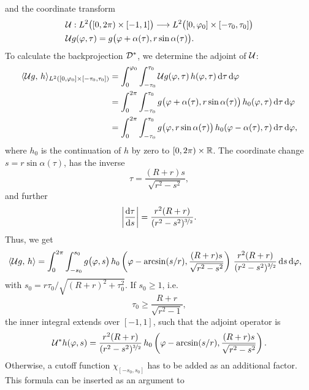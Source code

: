\documentclass{amsart}
\renewcommand*{\phi}{\varphi}
\begin{document}
%
and the coordinate transform 
%
\begin{align}
 &\OPU: L^2\big([0,2\pi) \times [-1,1]\big) \Lto L^2\big([0,\phi_0] \times [-\tau_0,\tau_0]\big) \notag \\
 \label{eq:fanflat:unit_trafo}
 &\OPU g(\phi, \tau) = g\big(\phi + \alpha(\tau), r\sin\alpha(\tau)\big).
\end{align} 
%
To calculate the backprojection ${\mathcal{D}}^*$, we determine the adjoint of ${\mathcal{U}}$:
%
\begin{align*}
 \INNER{\OPU g}{h}_{L^2([0,\phi_0] \times [-\tau_0,\tau_0])}
 &= \int_0^{\phi_0} \int_{-\tau_0}^{\tau_0} \OPU g(\phi, \tau)\, h(\phi, \tau)\, \D\tau\, \D\phi \\
 &= \int_0^{2\pi} \int_{-\tau_0}^{\tau_0} g\big(\phi + \alpha(\tau), r\sin\alpha(\tau)\big)\, h_0(\phi, \tau)\, \D\tau\, \D\phi \\
 &= \int_0^{2\pi} \int_{-\tau_0}^{\tau_0} g\big(\phi, r\sin\alpha(\tau)\big)\, h_0(\phi - \alpha(\tau), \tau)\, \D\tau\, \D\phi,
\end{align*}
%
where $h_0$ is the continuation of $h$ by zero to $[0,2\pi)\times{\ensuremath{\mathbb{R}}}$. The coordinate change $s = r\sin\alpha(\tau)$, has the 
inverse
%
\begin{equation*}
 \tau = \frac{(R+r)s}{\sqrt{r^2-s^2}},
\end{equation*}
%
and further
%
\begin{equation*}
 \left| \frac{\mathrm{d}\tau}{\mathrm{d} s} \right| = \frac{r^2(R+r)}{(r^2-s^2)^{\nicefrac{3}{2}}}.
\end{equation*}
%
Thus, we get
%
\begin{align*}
 \INNER{\OPU g}{h}
 &= \int_0^{2\pi} \int_{-s_0}^{s_0} g\big(\phi, s\big)\, h_0\left( \phi - \arcsin(s/r), \frac{(R+r)s}{\sqrt{r^2-s^2}} \right)\, 
 \frac{r^2(R+r)}{(r^2-s^2)^{\nicefrac{3}{2}}}\, \D s\, \D\phi,
\end{align*}
%
with $s_0 = r\tau_0 / \sqrt{(R+r)^2 + \tau_0^2}$. If $s_0\geq 1$, i.e.
%
\begin{equation}
 \label{eq:fanflat:condition_det_width}
 \tau_0 \geq \frac{R + r}{\sqrt{r^2-1}},
\end{equation}
%
the inner integral extends over $[-1,1]$, such that the adjoint operator is
%
\begin{equation}
 \label{eq:fanflat:unit_trafo_adj}
 \OPU^* h(\phi, s) = \frac{r^2(R+r)}{(r^2-s^2)^{\nicefrac{3}{2}}}\, h_0\left( \phi - \arcsin(s/r), \frac{(R+r)s}{\sqrt{r^2-s^2}} \right).
\end{equation} 
%
Otherwise, a cutoff function $\chi_{[-s_0,s_0]}$ has to be added as an additional factor. This formula can be inserted as an argument to
\end{document}
